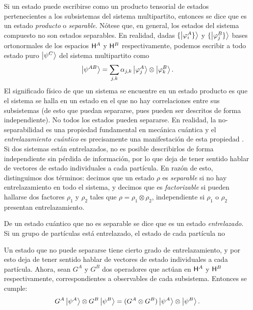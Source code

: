 Si un estado puede escribirse como un producto tensorial de estados pertenecientes a los subsistemas del sistema multipartito, entonces se dice que es un estado \textit{producto} o \textit{separable}. Nótese que, en general, los estados del sistema compuesto no son estados separables. En realidad, dadas $\{\ket{\varphi_{i}^{A}\}}$ y $\{\ket{\varphi_{j}^{B}\}}$ bases ortonormales de los espacios ${\sf H}^{A}$ y ${\sf H}^{B}$ respectivamente, podemos escribir a todo estado puro $\ket{\psi^{C}}$ del sistema multipartito como
\begin{equation}
    \ket{\psi^{AB}}=\sum_{j,k}\alpha_{j,k}\ket{\varphi_{j}^{A}}\otimes\ket{\varphi_{k}^{B}}.\nonumber
\end{equation}
El significado físico de que un sistema se encuentre en un estado producto es que el sistema se halla en un estado en el que no hay correlaciones entre sus subsistemas (de esto que puedan separarse, pues pueden ser descritos de forma independiente). No todos los estados pueden separarse. En realidad, la no-separabilidad es una propiedad fundamental en mecánica cuántica y el \textit{entrelazamiento cuántico} es precisamente una manifestación de esta propiedad \cite{Holevo}. Si dos sistemas están entrelazados, no es posible describirlos de forma independiente sin pérdida de información, por lo que deja de tener sentido hablar de vectores de estado individuales a cada partícula. En razón de esto, distinguimos dos términos: decimos que un estado $\rho$ es \textit{separable} si no hay entrelazamiento en todo el sistema, y decimos que es \textit{factorizable} si pueden hallarse dos factores $\rho_{1}$ y $\rho_{2}$ tales que $\rho=\rho_{1}\otimes\rho_{2}$, independiente si $\rho_{1}$ o $\rho_{2}$ presentan entrelazamiento.


De un estado cuántico que no es separable se dice que es un estado \textit{entrelazado}. Si un grupo de partículas está entrelazado, el estado de cada partícula no 

Un estado que no puede separarse tiene cierto grado de entrelazamiento, y por esto deja de tener sentido hablar de vectores de estado individuales a cada partícula. Ahora, sean $G^{A}$ y $G^{B}$ dos operadores que actúan en ${\sf H}^{A}$ y ${\sf H}^{B}$ respectivamente, correspondientes a observables de cada subsistema. Entonces se cumple:
\begin{equation}
    G^{A}\ket{\psi^{A}}\otimes G^{B}\ket{\psi^{B}}=(G^{A}\otimes G^{B})\ket{\psi^{A}}\otimes\ket{\psi^{B}}.\nonumber
\end{equation}

